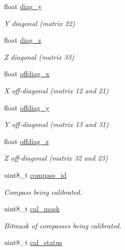 \begin{DoxyCompactItemize}
float \hyperlink{struct____mavlink__mag__cal__report__t_a4249b5e2f7bdfb54b042599e06a213ea}{diag\+\_\+y}
\begin{DoxyCompactList}\small\item\em Y diagonal (matrix 22) \end{DoxyCompactList}\item 
float \hyperlink{struct____mavlink__mag__cal__report__t_ad170900d87420d6c2dd2c0caac86e1c2}{diag\+\_\+z}
\begin{DoxyCompactList}\small\item\em Z diagonal (matrix 33) \end{DoxyCompactList}\item 
float \hyperlink{struct____mavlink__mag__cal__report__t_a5cff5f77e3fdb317371d64879a3547f3}{offdiag\+\_\+x}
\begin{DoxyCompactList}\small\item\em X off-\/diagonal (matrix 12 and 21) \end{DoxyCompactList}\item 
float \hyperlink{struct____mavlink__mag__cal__report__t_a0d9ef13c28fc15a5f3ea354cc1150a36}{offdiag\+\_\+y}
\begin{DoxyCompactList}\small\item\em Y off-\/diagonal (matrix 13 and 31) \end{DoxyCompactList}\item 
float \hyperlink{struct____mavlink__mag__cal__report__t_a4b4d3694a42168a039dc0fc0db7e0c42}{offdiag\+\_\+z}
\begin{DoxyCompactList}\small\item\em Z off-\/diagonal (matrix 32 and 23) \end{DoxyCompactList}\item 
uint8\+\_\+t \hyperlink{struct____mavlink__mag__cal__report__t_a25c1e2bdaa405bf0affa4a07241aa984}{compass\+\_\+id}
\begin{DoxyCompactList}\small\item\em Compass being calibrated. \end{DoxyCompactList}\item 
uint8\+\_\+t \hyperlink{struct____mavlink__mag__cal__report__t_ac09a5430a41669586c9ab02212c87e86}{cal\+\_\+mask}
\begin{DoxyCompactList}\small\item\em Bitmask of compasses being calibrated. \end{DoxyCompactList}\item 
uint8\+\_\+t \hyperlink{struct____mavlink__mag__cal__report__t_a65f9f846f62ed014cf610e4f2321ee40}{cal\+\_\+status}

\end{DoxyCompactItemize}
